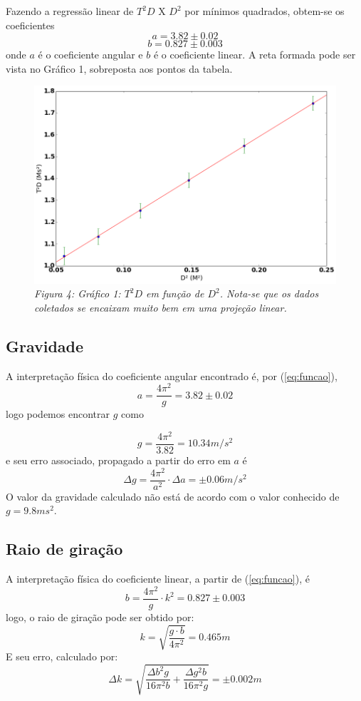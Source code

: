 \documentclass[12pt,a4paper]{article}
\begin{document}
Fazendo a regressão linear de $T^2D$ X $D^2$ por mínimos quadrados, obtem-se os coeficientes 
$$ a = 3.82 \pm 0.02 $$ 
 $$ b = 0.827 \pm 0.003 $$
onde $a$ é o coeficiente angular e $b$ é o coeficiente linear. A reta formada pode ser vista no Gráfico 1, sobreposta aos pontos da tabela.

\begin{figure}[!hbtbp]

\includegraphics[scale=0.55]{index.png} 
\emph{Figura 4: Gráfico 1: $T^2D$ em função de $D^2$. Nota-se que os dados coletados se encaixam muito bem em uma projeção linear.}

\label{fig:Grafico}
\end{figure}
\subsection{Gravidade}
A interpretação física do coeficiente angular encontrado é, por (\ref{eq:funcao}),
 $$ a = \frac{4\pi^2}{g} = 3.82 \pm 0.02$$
  logo podemos encontrar $g$ como 

  $$ g = \frac{4\pi^2}{3.82} = 10.34 m/s^2 $$ 
  e seu erro associado, propagado a partir do erro em $a$ é
  $$ \Delta g = \frac{4\pi^2}{a^2} \cdot \Delta a = \pm 0.06 m/s^2 $$
  O valor da gravidade calculado não está de acordo com o valor conhecido de $g =  9.8ms^2$.
\newpage
\subsection{Raio de giração}

A interpretação física do coeficiente linear, a partir de (\ref{eq:funcao}), é 
$$ b = \frac{4\pi^2}{g} \cdot k^2 = 0.827 \pm 0.003 $$
logo, o raio de giração pode ser obtido por:
$$ k = \sqrt{\frac{g \cdot b}{4\pi^2}} = 0.465 m $$
E seu erro, calculado por:
$$ \Delta k =
\sqrt{\frac{\Delta b^{2} g}{16 \pi^{2} b} + \frac{\Delta g^{2} b}{16 \pi^{2} g}} 
 =  \pm 0.002  m$$
\end{document}

